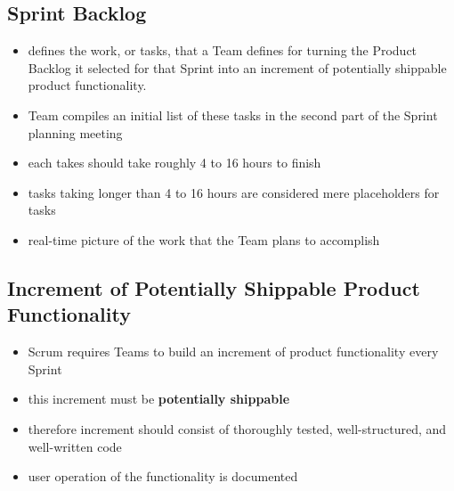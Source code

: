\subsection{Sprint Backlog}
\begin{itemize}
  \item defines the work, or tasks, that a Team defines for turning the Product Backlog it selected for that Sprint into an increment of potentially shippable product functionality.
  \item Team compiles an initial list of these tasks in the second part of the Sprint planning meeting
  \item each takes should take roughly 4 to 16 hours to finish
  \item tasks taking longer than 4 to 16 hours are considered mere placeholders for tasks
  \item real-time picture of the work that the Team plans to accomplish
\end{itemize}


\subsection{Increment of Potentially Shippable Product Functionality}
\begin{itemize}
  \item Scrum requires Teams to build an increment of product functionality every Sprint
  \item this increment must be \textbf{potentially shippable}
  \item therefore increment should consist of thoroughly tested, well-structured, and well-written code
  \item user operation of the functionality is documented
\end{itemize}

